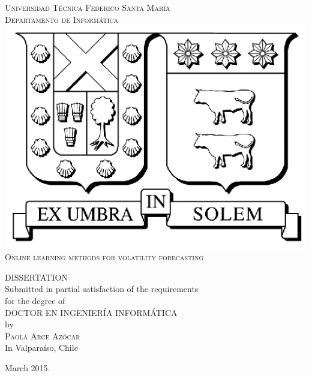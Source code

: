 \thispagestyle{empty}
\vspace{1.5in}
\begin{center}
{\textsc{Universidad T\'ecnica Federico Santa Mar\'ia}}\\
{\textsc{Departamento de Inform\'atica}}\\
\medskip
\includegraphics[scale=1]{fig/logo_usm.eps}
\bigskip
\bigskip
\bigskip
\bigskip \\
{\textsc{\Large{{Online learning methods for volatility forecasting}}}}\\%

\bigskip
\bigskip
\bigskip
\bigskip
\bigskip 

{\MakeUppercase{Dissertation}\\
\bigskip
\bigskip
Submitted in partial satisfaction of the requirements\\
for the degree of\\
\bigskip
\bigskip
\MakeUppercase{Doctor en Ingenier\'ia Inform\'atica}\\
\bigskip
\bigskip
by\\
\bigskip
{\textsc{\large{Paola Arce Az\'ocar}}}\\
\bigskip
\bigskip
In Valpara\'iso, Chile}
\end{center}

\begin{center}
{\normalsize March 2015.}
\end{center}

\pagebreak

